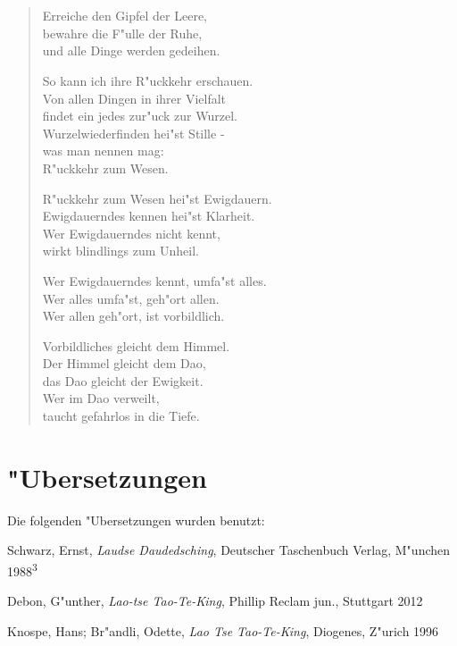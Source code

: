 \documentclass[a4paper,10pt,openany]{book}
\begin{document}
\chapter{}
\begin{verse}
    Erreiche den Gipfel der Leere,\\
    bewahre die F"ulle der Ruhe,\\
    und alle Dinge werden gedeihen.

    So kann ich ihre R"uckkehr erschauen.\\
    Von allen Dingen in ihrer Vielfalt\\
    findet ein jedes zur"uck zur Wurzel.\\
    Wurzelwiederfinden hei"st Stille -\\
    was man nennen mag:\\
    R"uckkehr zum Wesen.

    R"uckkehr zum Wesen hei"st Ewigdauern.\\
    Ewigdauerndes kennen hei"st Klarheit.\\
    Wer Ewigdauerndes nicht kennt,\\
    wirkt blindlings zum Unheil.

    Wer Ewigdauerndes kennt, umfa"st alles.\\
    Wer alles umfa"st, geh"ort allen.\\
    Wer allen geh"ort, ist vorbildlich.

    Vorbildliches gleicht dem Himmel.\\
    Der Himmel gleicht dem Dao,\\
    das Dao gleicht der Ewigkeit.\\
    Wer im Dao verweilt,\\
    taucht gefahrlos in die Tiefe.
\end{verse}


\appendix
\chapter{"Ubersetzungen}

Die folgenden "Ubersetzungen wurden benutzt:

\begin{description}
\item Schwarz, Ernst, \textit{Laudse Daudedsching}, Deutscher Taschenbuch Verlag, M"unchen 1988\textsuperscript{3}
\item Debon, G"unther, \textit{Lao-tse Tao-Te-King}, Phillip Reclam jun., Stuttgart 2012
\item Knospe, Hans; Br"andli, Odette, \textit{Lao Tse Tao-Te-King}, Diogenes, Z"urich 1996
\end{description}
\end{document}
